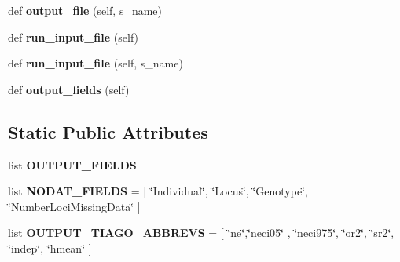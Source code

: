 \begin{DoxyCompactItemize}
\item 
def {\bfseries output\+\_\+file} (self, s\+\_\+name)\hypertarget{classnegui_1_1pgoutputneestimator_1_1PGOutputNeEstimator_a67501f770ac63303d0ed3b69fc148544}{}\label{classnegui_1_1pgoutputneestimator_1_1PGOutputNeEstimator_a67501f770ac63303d0ed3b69fc148544}

\item 
def {\bfseries run\+\_\+input\+\_\+file} (self)\hypertarget{classnegui_1_1pgoutputneestimator_1_1PGOutputNeEstimator_ac3204c39eb40e0e5a9c16906382d98a5}{}\label{classnegui_1_1pgoutputneestimator_1_1PGOutputNeEstimator_ac3204c39eb40e0e5a9c16906382d98a5}

\item 
def {\bfseries run\+\_\+input\+\_\+file} (self, s\+\_\+name)\hypertarget{classnegui_1_1pgoutputneestimator_1_1PGOutputNeEstimator_aaa66e700b71e0f86af69c9301be4aed2}{}\label{classnegui_1_1pgoutputneestimator_1_1PGOutputNeEstimator_aaa66e700b71e0f86af69c9301be4aed2}

\item 
def {\bfseries output\+\_\+fields} (self)\hypertarget{classnegui_1_1pgoutputneestimator_1_1PGOutputNeEstimator_a3c833e27a8bf526b8e0003843d21f7aa}{}\label{classnegui_1_1pgoutputneestimator_1_1PGOutputNeEstimator_a3c833e27a8bf526b8e0003843d21f7aa}

\end{DoxyCompactItemize}
\subsection*{Static Public Attributes}
\begin{DoxyCompactItemize}
\item 
list {\bfseries O\+U\+T\+P\+U\+T\+\_\+\+F\+I\+E\+L\+DS}
\item 
list {\bfseries N\+O\+D\+A\+T\+\_\+\+F\+I\+E\+L\+DS} = \mbox{[} \char`\"{}Individual\char`\"{}, \char`\"{}Locus\char`\"{}, \char`\"{}Genotype\char`\"{}, \char`\"{}Number\+Loci\+Missing\+Data\char`\"{} \mbox{]}\hypertarget{classnegui_1_1pgoutputneestimator_1_1PGOutputNeEstimator_a4e5c6c9926a8f963e36d83d858366c4d}{}\label{classnegui_1_1pgoutputneestimator_1_1PGOutputNeEstimator_a4e5c6c9926a8f963e36d83d858366c4d}

\item 
list {\bfseries O\+U\+T\+P\+U\+T\+\_\+\+T\+I\+A\+G\+O\+\_\+\+A\+B\+B\+R\+E\+VS} = \mbox{[} \char`\"{}ne\char`\"{},\char`\"{}neci05\char`\"{} , \char`\"{}neci975\char`\"{}, \char`\"{}or2\char`\"{}, \char`\"{}sr2\char`\"{}, \char`\"{}indep\char`\"{}, \char`\"{}hmean\char`\"{} \mbox{]}\hypertarget{classnegui_1_1pgoutputneestimator_1_1PGOutputNeEstimator_a916a47666e6360ea279b944832907b27}{}\label{classnegui_1_1pgoutputneestimator_1_1PGOutputNeEstimator_a916a47666e6360ea279b944832907b27}

\end{DoxyCompactItemize}


